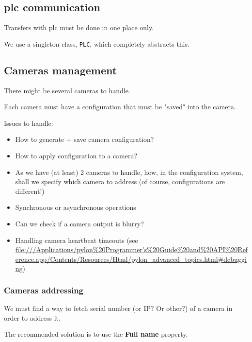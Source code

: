 \subsection{\gls{plc} communication}

Transfers with \gls{plc} must be done in one place only.

We use a singleton class, \texttt{PLC}, which completely abstracts this.


\subsection{Cameras management}

There might be several cameras to handle.

Each camera must have a configuration that must be "saved" into the camera.

Issues to handle:

\begin{itemize}
    \item How to generate + save camera configuration?
    \item How to apply configuration to a camera?
    \item As we have (at least) 2 cameras to handle, how, in the configuration system,
        shall we specify which camera to address (of course, configurations are different!)
    \item Synchronous or asynchronous operations
    \item Can we check if a camera output is blurry?
    \item Handling camera heartbeat timeouts (see \url{file:///Applications/pylon%20Programmer's%20Guide%20and%20API%20Reference.app/Contents/Resources/Html/pylon_advanced_topics.html#debugging})
\end{itemize}

\subsubsection{Cameras addressing}

We must find a way to fetch serial number (or IP? Or other?) of a camera in order to address it.

The recommended solution is to use the \textbf{Full name} property.

